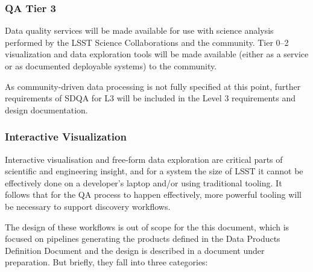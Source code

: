 \subsubsection{QA Tier 3}
\label{sec:qaQA3}

Data quality services will be made available for use with science analysis performed by the LSST Science Collaborations and the community. Tier 0--2 visualization and data exploration tools will be made available (either as a service or as documented deployable systems) to the community.

As community-driven data processing is not fully specified at this point, further requirements of SDQA for L3 will be included in the Level 3 requirements and design documentation. 


\subsubsection{Interactive Visualization}
\label{sec:qaInteractiveVis}

Interactive visualisation and free-form data exploration are critical parts of scientific and engineering insight, and for a system the size of LSST it cannot be effectively done on a developer's laptop and/or using traditional tooling. It follows that for the QA process to happen effectively, more powerful tooling will be necessary to support discovery workflows.

The design of these workflows is out of scope for the this document, which is focused on pipelines generating the products defined in the Data Products Definition Document and the design is described in a document under preparation. But briefly, they fall into three categories:

